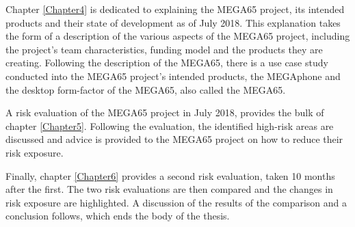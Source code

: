 Chapter \ref{Chapter4} is dedicated to explaining the MEGA65 project, its intended products and their state of development as of July 2018. This explanation takes the form of a description of the various aspects of the MEGA65 project, including the project's team characteristics, funding model and the products they are creating. Following the description of the MEGA65, there is a use case study conducted into the MEGA65 project's intended products, the MEGAphone and the desktop form-factor of the MEGA65, also called the MEGA65. 

A risk evaluation of the MEGA65 project in July 2018, provides the bulk of chapter \ref{Chapter5}. Following the evaluation, the identified high-risk areas are discussed and advice is provided to the MEGA65 project on how to reduce their risk exposure. 

Finally, chapter \ref{Chapter6} provides a second risk evaluation, taken 10 months after the first. The two risk evaluations are then compared and the changes in risk exposure are highlighted. A discussion of the results of the comparison and a conclusion follows, which ends the body of the thesis.
